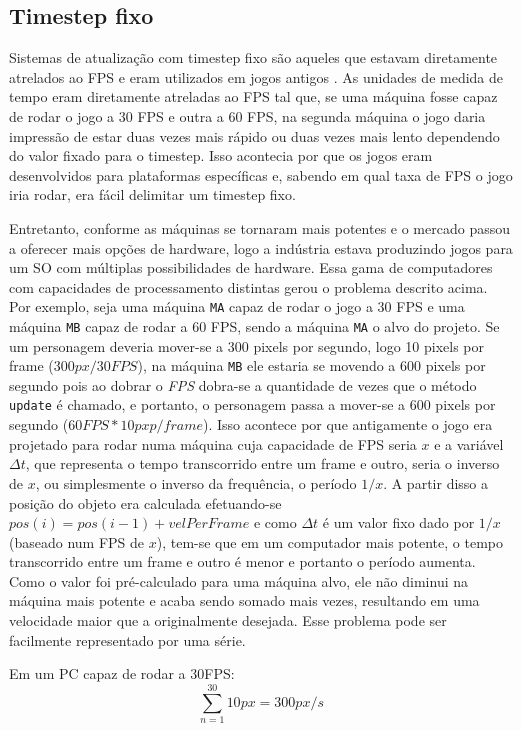 \documentclass[12pt, 
openright, 
oneside, 
a4paper,    
brazil]{facom-ufu-abntex2}
\begin{document}
\subsection{Timestep fixo}
Sistemas de atualização com timestep fixo são aqueles que estavam diretamente atrelados ao FPS e eram utilizados em jogos antigos \cite{GameEngineArchitecture}. As unidades de medida de tempo eram diretamente atreladas ao FPS tal que, se uma máquina fosse capaz de rodar o jogo a 30 FPS e outra a 60 FPS, na segunda máquina o jogo daria impressão de estar duas vezes mais rápido ou duas vezes mais lento dependendo do valor fixado para o timestep. Isso acontecia por que os jogos eram desenvolvidos para plataformas específicas e, sabendo em qual taxa de FPS o jogo iria rodar, era fácil delimitar um timestep fixo.

Entretanto, conforme as máquinas se tornaram mais potentes e o mercado passou a oferecer mais opções de hardware, logo a indústria estava produzindo jogos para um SO com múltiplas possibilidades de hardware. Essa gama de computadores com capacidades de processamento distintas gerou o problema descrito acima. Por exemplo, seja uma máquina \texttt{MA} capaz de rodar o jogo a 30 FPS e uma máquina \texttt{MB} capaz de rodar a 60 FPS, sendo a máquina \texttt{MA} o alvo do projeto. Se um personagem deveria mover-se a  300 pixels por segundo, logo 10 pixels por frame ($300 px/ 30 FPS$), na máquina \texttt{MB} ele estaria se movendo a 600 pixels por segundo pois ao dobrar o \textit{FPS} dobra-se a quantidade de vezes que o método \texttt{update} é chamado, e portanto, o personagem passa a mover-se a 600 pixels por segundo ($60 FPS * 10 px p/ frame$). Isso acontece por que antigamente o jogo era projetado para rodar numa máquina cuja capacidade de FPS seria $x$ e a variável $\Delta t$, que representa o tempo transcorrido entre um frame e outro, seria o inverso de $x$, ou simplesmente o inverso da frequência, o período $1/x$. A partir disso a posição do objeto era calculada efetuando-se $pos(i) = pos(i-1) + velPerFrame$ e como $\Delta t$ é um valor fixo dado por $1/x$ (baseado num FPS de $x$), tem-se que em um computador mais potente, o tempo transcorrido entre um frame e outro é menor e portanto o período aumenta. Como o valor foi pré-calculado para uma máquina alvo, ele não diminui na máquina mais potente e acaba sendo somado mais vezes, resultando em uma velocidade maior que a originalmente desejada. Esse problema pode ser facilmente representado por uma série.

\noindent
Em um PC capaz de rodar a 30FPS: $$\sum_{n=1}^{30} 10px = 300 px/s$$
\end{document}
